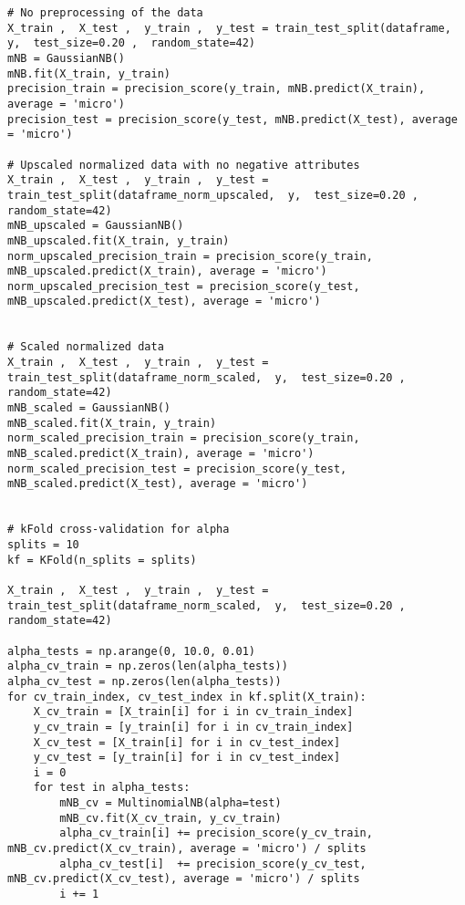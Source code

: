 \begin{lstlisting}
# No preprocessing of the data
X_train ,  X_test ,  y_train ,  y_test = train_test_split(dataframe,  y,  test_size=0.20 ,  random_state=42)
mNB = GaussianNB()
mNB.fit(X_train, y_train)
precision_train = precision_score(y_train, mNB.predict(X_train), average = 'micro')
precision_test = precision_score(y_test, mNB.predict(X_test), average = 'micro')

# Upscaled normalized data with no negative attributes
X_train ,  X_test ,  y_train ,  y_test = train_test_split(dataframe_norm_upscaled,  y,  test_size=0.20 ,  random_state=42)
mNB_upscaled = GaussianNB()
mNB_upscaled.fit(X_train, y_train)
norm_upscaled_precision_train = precision_score(y_train, mNB_upscaled.predict(X_train), average = 'micro')
norm_upscaled_precision_test = precision_score(y_test, mNB_upscaled.predict(X_test), average = 'micro')


# Scaled normalized data 
X_train ,  X_test ,  y_train ,  y_test = train_test_split(dataframe_norm_scaled,  y,  test_size=0.20 ,  random_state=42)
mNB_scaled = GaussianNB()
mNB_scaled.fit(X_train, y_train)
norm_scaled_precision_train = precision_score(y_train, mNB_scaled.predict(X_train), average = 'micro')
norm_scaled_precision_test = precision_score(y_test, mNB_scaled.predict(X_test), average = 'micro')


# kFold cross-validation for alpha
splits = 10
kf = KFold(n_splits = splits)

X_train ,  X_test ,  y_train ,  y_test = train_test_split(dataframe_norm_scaled,  y,  test_size=0.20 ,  random_state=42)

alpha_tests = np.arange(0, 10.0, 0.01)
alpha_cv_train = np.zeros(len(alpha_tests))
alpha_cv_test = np.zeros(len(alpha_tests))
for cv_train_index, cv_test_index in kf.split(X_train):
    X_cv_train = [X_train[i] for i in cv_train_index]
    y_cv_train = [y_train[i] for i in cv_train_index]
    X_cv_test = [X_train[i] for i in cv_test_index]
    y_cv_test = [y_train[i] for i in cv_test_index]
    i = 0
    for test in alpha_tests:
        mNB_cv = MultinomialNB(alpha=test)
        mNB_cv.fit(X_cv_train, y_cv_train)
        alpha_cv_train[i] += precision_score(y_cv_train, mNB_cv.predict(X_cv_train), average = 'micro') / splits
        alpha_cv_test[i]  += precision_score(y_cv_test, mNB_cv.predict(X_cv_test), average = 'micro') / splits
        i += 1

\end{lstlisting}
